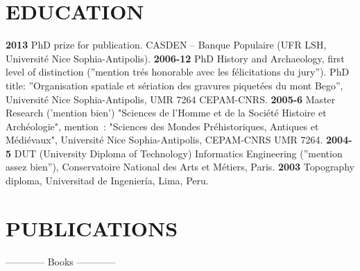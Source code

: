 \documentclass[11pt]{report} %
\begin{document}
\section*{EDUCATION}

\textbf{2013 }PhD prize for publication. CASDEN -- Banque Populaire (UFR LSH, Universit\'{e} Nice Sophia-Antipolis).
\smallbreak
\textbf{2006-12 }PhD History and Archaeology, first level of distinction (''mention tr\'{e}s honorable avec les f\'{e}licitations du jury''). PhD title: ''Organisation spatiale et s\'{e}riation des gravures piquet\'{e}es du mont Bego'', Universit\'{e} Nice Sophia-Antipolis, UMR 7264 CEPAM-CNRS.
\smallbreak
\textbf{2005-6 }Master Research ('mention bien') "Sciences de l'Homme et de la Soci\'{e}t\'{e} Histoire et Arch\'{e}ologie", mention~: "Sciences des Mondes Pr\'{e}historiques, Antiques et M\'{e}di\'{e}vaux", Universit\'{e} Nice Sophia-Antipolis, CEPAM-CNRS UMR 7264.
\smallbreak
\textbf{2004-5 }DUT (University Diploma of Technology) Informatics Engineering (''mention assez bien''), Conservatoire National des Arts et M\'{e}tiers, Paris.
\smallbreak
\textbf{2003 } Topography diploma, Universitad de Ingenier\'{i}a, Lima, Peru.

\section*{PUBLICATIONS}

\begin{center}------------ Books ------------ \end{center}
\end{document}
